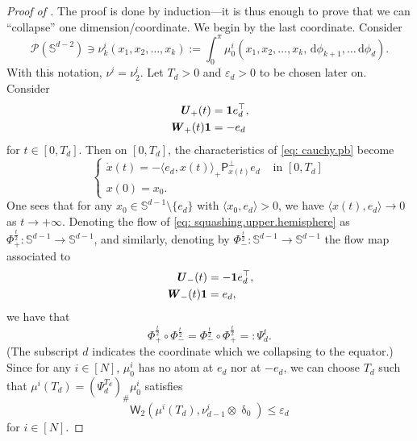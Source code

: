 \documentclass[a4paper,11pt]{article}
\theoremstyle{plain}
\newcommand{\proj}{\bm{\mathsf{P}}^\perp}
\newcommand{\diff}{\, \mathrm{d}}
\renewcommand{\S}{\mathbb{S}^{d-1}}
\newcommand{\bW}{\bm{\mathit{W}}}
\newcommand{\bU}{\bm{\mathit{U}}}
\renewcommand{\leq}{\leqslant}
\numberwithin{equation}{section}
\newcommand{\nbbg}[1]{ {\text{\bf bg:} \color{mygrey}{#1}} }
\begin{document}
\begin{proof}[Proof of ]
The proof is done by induction---it is thus enough to prove that we can ``collapse'' one dimension/coordinate. We begin by the last coordinate.
Consider
\begin{equation*}
\mathscr{P}(\mathbb{S}^{d-2})\ni\nu^i_{k}(x_1,x_2,\ldots,x_{k}):=\int_0^\pi \mu_0^i(x_1,x_2,\ldots,x_{k},\diff\phi_{k+1},\ldots\diff\phi_d).
\end{equation*}
With this notation, $\nu^i = \nu^i_{2}$.
Let $T_d>0$ and $\varepsilon_d>0$ to be chosen later on.
Consider%
\begin{align*}
\bU_+(t)&={\bf1} e_d^\top,\\
\bW_+(t){\bf1}&=-e_d
\end{align*}
for $t\in[0,T_d]$.
Then on $[0,T_d]$, the characteristics of \eqref{eq: cauchy.pb} become
\begin{equation}\label{eq: squashing.upper.hemisphere}
\begin{cases}
\dot{x}(t)=-\langle e_d,x(t)\rangle_+\proj_{x(t)}e_d &\text{ in } [0,T_d] \\
x(0) = x_0.
\end{cases}
\end{equation}
One sees that for any $x_0\in\S\setminus\{e_d\}$ with $\langle x_0, e_d\rangle >0$, we have
$\langle x(t),e_d\rangle \to 0$ as $t\to+\infty$. 
Denoting the flow of \eqref{eq: squashing.upper.hemisphere} as $\Phi^{\frac{t}{2}}_+:\S\to\S$, and similarly, denoting by $\Phi^{\frac{t}{2}}_-:\S\to\S$ the flow map associated to
\begin{align*}
\bU_-(t)&=-{\bf1} e_d^\top,\\
\bW_-(t){\bf1}&=e_d,
\end{align*}
we have that
\begin{equation*}
\Phi^{\frac{t}{2}}_+\circ \Phi^{\frac{t}{2}}_-=\Phi^{\frac{t}{2}}_-\circ \Phi^{\frac{t}{2}}_+=:\Psi_d^t.
\end{equation*}
(The subscript $d$ indicates the coordinate which we collapsing to the equator.)
Since for any $i\in[N]$, $\mu^i_0$ has no atom at $e_d$ nor at $-e_d$, we can choose $T_d$ such that $\mu^i(T_d)=(\Psi^{T_d}_d)_{\#}\mu_0^i$ satisfies
\begin{equation*}
\mathsf{W}_2\left(\mu^i(T_d),\nu^i_{d-1}\otimes \updelta_{0}\right)\leq\varepsilon_d
\end{equation*}
for $i\in[N]$.


\end{proof}
\end{document}
